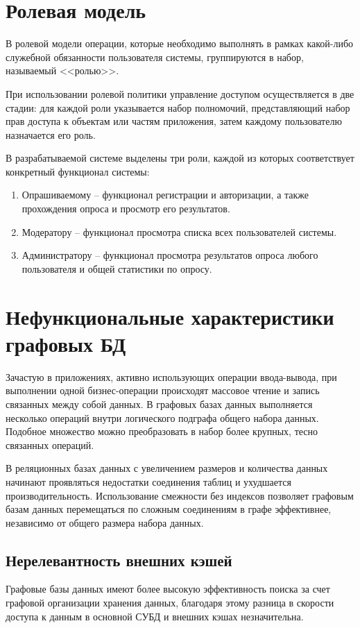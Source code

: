 \section{Ролевая модель} 
В ролевой модели\cite{Leonard1973} операции, которые необходимо выполнять в рамках какой-либо служебной обязанности пользователя системы, группируются в набор, называемый <<ролью>>.

При использовании ролевой политики управление доступом осуществляется в две стадии: для каждой роли указывается набор полномочий, представляющий набор прав доступа к объектам или частям приложения, затем каждому пользователю назначается его роль.

В разрабатываемой системе выделены три роли, каждой из которых соответствует конкретный функционал системы:
\begin{enumerate}
	\item Опрашиваемому -- функционал регистрации и авторизации, а также прохождения опроса и просмотр его результатов.
	\item Модератору -- функционал просмотра списка всех пользователей системы.
	\item Администратору -- функционал просмотра результатов опроса любого пользователя и общей статистики по опросу.
\end{enumerate}


\section{Нефункциональные характеристики графовых БД}
Зачастую в приложениях, активно использующих операции ввода-вывода, при выполнении одной бизнес-операции происходят массовое чтение и запись связанных между собой данных. В графовых базах данных выполняется несколько операций внутри логического подграфа общего набора данных. Подобное множество можно преобразовать в набор более крупных, тесно связанных операций.

В реляционных базах данных с увеличением размеров и количества данных начинают проявляться недостатки соединения таблиц и ухудшается производительность. Использование смежности без индексов позволяет графовым базам данных перемещаться по сложным соединениям в графе эффективнее, независимо от общего размера набора данных.
\subsection{Нерелевантность внешних кэшей}
Графовые базы данных имеют более высокую эффективность поиска за счет графовой организации хранения данных, благодаря этому разница в скорости доступа к данным в основной СУБД и внешних кэшах незначительна.\cite{Sholichah2020} 

